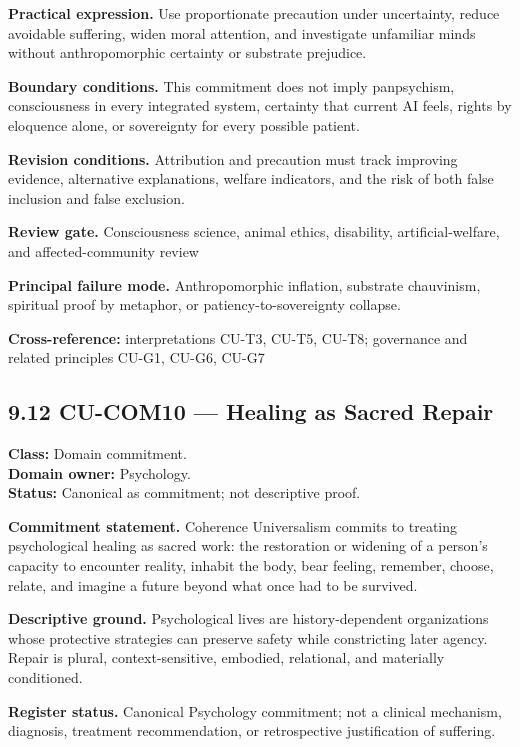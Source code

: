 \documentclass[
  11pt,
]{article}
\begin{document}
\textbf{Practical expression.} Use proportionate precaution under
uncertainty, reduce avoidable suffering, widen moral attention, and
investigate unfamiliar minds without anthropomorphic certainty or
substrate prejudice.

\textbf{Boundary conditions.} This commitment does not imply
panpsychism, consciousness in every integrated system, certainty that
current AI feels, rights by eloquence alone, or sovereignty for every
possible patient.

\textbf{Revision conditions.} Attribution and precaution must track
improving evidence, alternative explanations, welfare indicators, and
the risk of both false inclusion and false exclusion.

\textbf{Review gate.} Consciousness science, animal ethics, disability,
artificial-welfare, and affected-community review

\textbf{Principal failure mode.} Anthropomorphic inflation, substrate
chauvinism, spiritual proof by metaphor, or patiency-to-sovereignty
collapse.

\textbf{Cross-reference:} interpretations CU-T3, CU-T5, CU-T8;
governance and related principles CU-G1, CU-G6, CU-G7

\subsection{9.12 CU-COM10 --- Healing as Sacred
Repair}\label{cu-com10-healing-as-sacred-repair}

\textbf{Class:} Domain commitment.\\
\textbf{Domain owner:} Psychology.\\
\textbf{Status:} Canonical as commitment; not descriptive proof.

\textbf{Commitment statement.} Coherence Universalism commits to
treating psychological healing as sacred work: the restoration or
widening of a person's capacity to encounter reality, inhabit the body,
bear feeling, remember, choose, relate, and imagine a future beyond what
once had to be survived.

\textbf{Descriptive ground.} Psychological lives are history-dependent
organizations whose protective strategies can preserve safety while
constricting later agency. Repair is plural, context-sensitive,
embodied, relational, and materially conditioned.

\textbf{Register status.} Canonical Psychology commitment; not a
clinical mechanism, diagnosis, treatment recommendation, or
retrospective justification of suffering.
\end{document}
